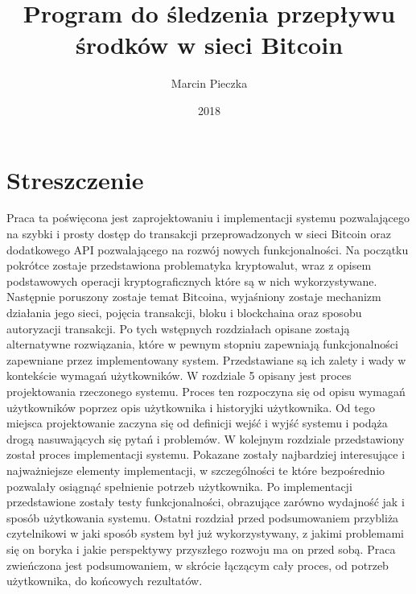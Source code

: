 \documentclass[12pt, en, eng, oneside, final]{mgr}
\begin{document}
\title{Program do śledzenia przepływu środków w sieci Bitcoin}
\date{2018}
\author{Marcin Pieczka}
\maketitle

\tableofcontents

\pagebreak 

\section*{Streszczenie}
Praca ta poświęcona jest zaprojektowaniu i implementacji systemu pozwalającego na szybki i prosty dostęp do transakcji przeprowadzonych w sieci Bitcoin oraz dodatkowego API pozwalającego na rozwój nowych funkcjonalności. Na początku pokrótce zostaje przedstawiona problematyka kryptowalut, wraz z opisem podstawowych operacji kryptograficznych które są w nich wykorzystywane. Następnie poruszony zostaje temat Bitcoina, wyjaśniony zostaje mechanizm działania jego sieci, pojęcia transakcji, bloku i blockchaina oraz sposobu autoryzacji transakcji. Po tych wstępnych rozdziałach opisane zostają alternatywne rozwiązania, które w pewnym stopniu zapewniają funkcjonalności zapewniane przez implementowany system. Przedstawiane są ich zalety i wady w kontekście wymagań użytkowników. W rozdziale 5 opisany jest proces projektowania rzeczonego systemu. Proces ten rozpoczyna się od opisu wymagań użytkowników poprzez opis użytkownika i historyjki użytkownika. Od tego miejsca projektowanie zaczyna się od definicji wejść i wyjść systemu i podąża drogą nasuwających się pytań i problemów. W kolejnym rozdziale przedstawiony został proces implementacji systemu. Pokazane zostały najbardziej interesujące i najważniejsze elementy implementacji, w szczególności te które bezpośrednio pozwalały osiągnąć spełnienie potrzeb użytkownika. Po implementacji przedstawione zostały testy funkcjonalności, obrazujące zarówno wydajność jak i sposób użytkowania systemu. Ostatni rozdział przed podsumowaniem przybliża czytelnikowi w jaki sposób system był już wykorzystywany, z jakimi problemami się on boryka i jakie perspektywy przyszłego rozwoju ma on przed sobą. Praca zwieńczona jest podsumowaniem, w skrócie łączącym cały proces, od potrzeb użytkownika, do końcowych rezultatów. 
\end{document}
